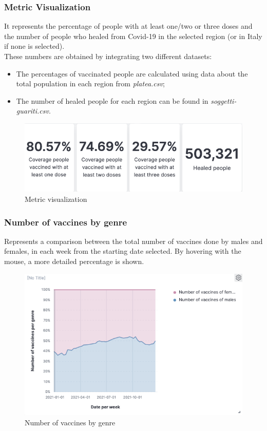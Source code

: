 \documentclass[12pt, a4paper]{article}
\begin{document}
\subsubsection{Metric Visualization}
It represents the percentage of people with at least one/two or three doses and the 
number of people who healed from Covid-19 in the selected region (or in Italy if none 
is selected). \\
These numbers are obtained by integrating two different datasets:
 \begin{itemize}
\item The percentages of vaccinated people are calculated using data about the total population in each region from \emph{platea.csv};
\item The number of healed people for each region can be found in \emph{soggetti-guariti.csv}.
 \end{itemize}
\begin{figure}[H]
  \centering
  \includegraphics[width=.8\linewidth]{img (8).png}
\caption*{Metric visualization}
\end{figure}

\subsubsection{Number of vaccines by genre}
Represents a comparison between the total number of vaccines done by males and females,
in each week from the starting date selected. By hovering with the mouse, a more 
detailed percentage is shown.
\begin{figure}[H]
  \centering
  \includegraphics[width=.8\linewidth]{img (9).png}
\caption*{Number of vaccines by genre}
\end{figure}
\end{document}
